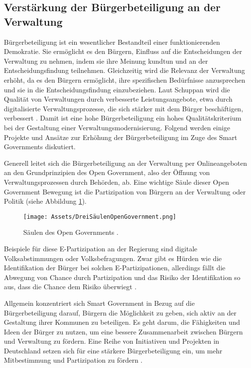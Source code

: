 \subsection{Verstärkung der Bürgerbeteiligung an der Verwaltung}\label{VortBürgerbeteiligung}
Bürgerbeteiligung ist ein wesentlicher Bestandteil einer funktionierenden Demokratie. 
Sie ermöglicht es den Bürgern, Einfluss auf die Entscheidungen der Verwaltung zu nehmen, indem sie ihre Meinung kundtun und an der Entscheidungsfindung teilnehmen.
Gleichzeitig wird die Relevanz der Verwaltung erhöht, da es den Bürgern ermöglicht, ihre spezifischen Bedürfnisse anzusprechen und sie in die Entscheidungsfindung einzubeziehen.
Laut Schuppan wird die Qualität von Verwaltungen durch verbesserte Leistungsangebote, etwa durch digitalisierte Verwaltungsprozesse, die sich stärker mit dem Bürger beschäftigen, verbessert \citep[Vgl.][S.35]{Schuppan2016}.
Damit ist eine hohe Bürgerbeteiligung ein hohes Qualitätskriterium bei der Gestaltung einer Verwaltungsmodernisierung.
Folgend werden einige Projekte und Ansätze zur Erhöhung der Bürgerbeteiligung im Zuge des Smart Governments diskutiert.
\par
Generell leitet sich die Bürgerbeteiligung an der Verwaltung per Onlineangeboten an den Grundprinzipien des Open Government, also der Öffnung von Verwaltungsprozessen durch Behörden, ab.
Eine wichtige Säule dieser Open Government Bewegung ist die Partizipation von Bürgern an der Verwaltung oder Politik (siehe Abbildung \ref{fig:DreiSäulenOpenGovernment}).
\begin{figure}[h]
 \centering
 \texttt{[image: Assets/DreiSäulenOpenGovernment.png]}
 \caption{Säulen des Open Governments \citep[][]{Leitner2018}.}
 \label{fig:DreiSäulenOpenGovernment}
\end{figure}
Beispiele für diese E-Partizipation an der Regierung sind digitale Volksabstimmungen oder Volksbefragungen.
Zwar gibt es Hürden wie die Identifikation der Bürger bei solchen E-Partizipationen, allerdings fällt die Abwegung von Chance durch Partizipation und das Risiko der Identifikation so aus, dass die Chance dem Risiko überwiegt \citep[][S. 15]{Leitner2018}.
\par
Allgemein konzentriert sich Smart Government in Bezug auf die Bürgerbeteiligung darauf, Bürgern die Möglichkeit zu geben, sich aktiv an der Gestaltung ihrer Kommunen zu beteiligen. 
Es geht darum, die Fähigkeiten und Ideen der Bürger zu nutzen, um eine bessere Zusammenarbeit zwischen Bürgern und Verwaltung zu fördern.  
Eine Reihe von Initiativen und Projekten in Deutschland setzen sich für eine stärkere Bürgerbeteiligung ein, um mehr Mitbestimmung und Partizipation zu fördern \citep[][S. 18, 49-50]{Leitner2018}.
